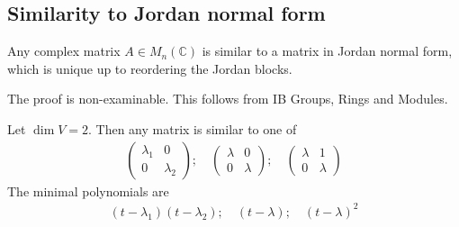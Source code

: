 \subsection{Similarity to Jordan normal form}
\begin{theorem}
	Any complex matrix $A \in M_n(\mathbb C)$ is similar to a matrix in Jordan normal form, which is unique up to reordering the Jordan blocks.
\end{theorem}
\noindent The proof is non-examinable.
This follows from IB Groups, Rings and Modules.
\begin{example}
	Let $\dim V = 2$.
	Then any matrix is similar to one of
	\begin{align*}
		\begin{pmatrix}
			\lambda_1 & 0         \\
			0         & \lambda_2
		\end{pmatrix};\quad
		\begin{pmatrix}
			\lambda & 0       \\
			0       & \lambda
		\end{pmatrix};\quad
		\begin{pmatrix}
			\lambda & 1       \\
			0       & \lambda
		\end{pmatrix}
	\end{align*}
	The minimal polynomials are
	\begin{align*}
		(t-\lambda_1)(t-\lambda_2);\quad (t-\lambda);\quad (t-\lambda)^2
	\end{align*}
\end{example}

